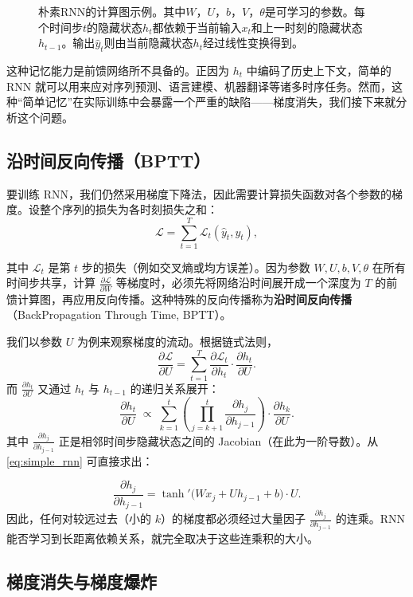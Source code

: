 \begin{figure}
\centering

\caption{朴素RNN的计算图示例。其中$W$，$U$，$b$，$V$，$\theta$是可学习的参数。每个时间步$t$的隐藏状态$h_t$都依赖于当前输入$x_t$和上一时刻的隐藏状态$h_{t-1}$。输出$\hat{y}_t$则由当前隐藏状态$h_t$经过线性变换得到。}
\label{fig:simple_rnn}
\end{figure}

这种记忆能力是前馈网络所不具备的。正因为 $h_t$ 中编码了历史上下文，简单的 RNN 就可以用来应对序列预测、语言建模、机器翻译等诸多时序任务。然而，这种“简单记忆”在实际训练中会暴露一个严重的缺陷——梯度消失，我们接下来就分析这个问题。

\subsection{沿时间反向传播（BPTT）}
要训练 RNN，我们仍然采用梯度下降法，因此需要计算损失函数对各个参数的梯度。设整个序列的损失为各时刻损失之和：
\[
\mathcal{L} = \sum_{t=1}^T \mathcal{L}_t(\hat{y}_t, y_t),
\]

其中 $\mathcal{L}_t$ 是第 $t$ 步的损失（例如交叉熵或均方误差）。因为参数 $W, U, b, V, \theta$ 在所有时间步共享，计算 $\frac{\partial\mathcal{L}}{\partial W}$ 等梯度时，必须先将网络沿时间展开成一个深度为 $T$ 的前馈计算图，再应用反向传播。这种特殊的反向传播称为\textbf{沿时间反向传播}（BackPropagation Through Time, BPTT）。

我们以参数 $U$ 为例来观察梯度的流动。根据链式法则，
\[
\frac{\partial\mathcal{L}}{\partial U} = \sum_{t=1}^T \frac{\partial\mathcal{L}_t}{\partial h_t} \cdot \frac{\partial h_t}{\partial U}.
\]
而 $\frac{\partial h_t}{\partial U}$ 又通过 $h_t$ 与 $h_{t-1}$ 的递归关系展开：
\[
\frac{\partial h_t}{\partial U} \;\propto\; \sum_{k=1}^t \left( \prod_{j=k+1}^t \frac{\partial h_j}{\partial h_{j-1}} \right) \cdot \frac{\partial h_k}{\partial U}.
\]
其中 $\frac{\partial h_j}{\partial h_{j-1}}$ 正是相邻时间步隐藏状态之间的 Jacobian（在此为一阶导数）。从 \eqref{eq:simple_rnn} 可直接求出：

\begin{equation}\label{eq:dh_dh}
    \frac{\partial h_j}{\partial h_{j-1}} = \tanh'\big(W x_j + U h_{j-1} + b\big) \cdot U.
\end{equation}
因此，任何对较远过去（小的 $k$）的梯度都必须经过大量因子 $\frac{\partial h_j}{\partial h_{j-1}}$ 的连乘。RNN 能否学习到长距离依赖关系，就完全取决于这些连乘积的大小。

\subsection{梯度消失与梯度爆炸}


